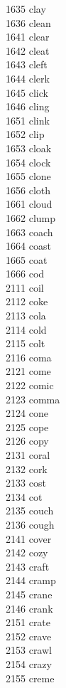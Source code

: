 1635 clay \\
1636 clean \\
1641 clear \\
1642 cleat \\
1643 cleft \\
1644 clerk \\
1645 click \\
1646 cling \\
1651 clink \\
1652 clip \\
1653 cloak \\
1654 clock \\
1655 clone \\
1656 cloth \\
1661 cloud \\
1662 clump \\
1663 coach \\
1664 coast \\
1665 coat \\
1666 cod \\
2111 coil \\
2112 coke \\
2113 cola \\
2114 cold \\
2115 colt \\
2116 coma \\
2121 come \\
2122 comic \\
2123 comma \\
2124 cone \\
2125 cope \\
2126 copy \\
2131 coral \\
2132 cork \\
2133 cost \\
2134 cot \\
2135 couch \\
2136 cough \\
2141 cover \\
2142 cozy \\
2143 craft \\
2144 cramp \\
2145 crane \\
2146 crank \\
2151 crate \\
2152 crave \\
2153 crawl \\
2154 crazy \\
2155 creme \\
